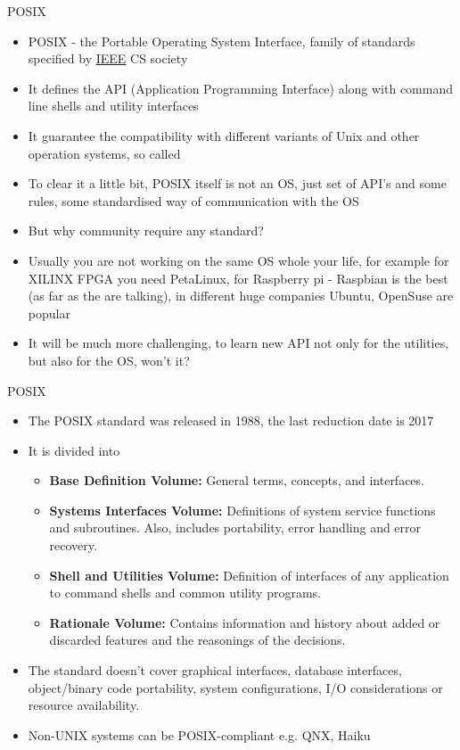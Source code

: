 \documentclass[usenames,dvipsnames,10pt,aspectratio=169]{beamer}
\begin{document}
\begin{frame}{POSIX}
    \begin{itemize}
        \item POSIX - the Portable Operating System Interface, family of standards specified by \href{https://www.ieee.org/}{IEEE} CS society
        \item It defines the API (Application Programming Interface) along with command line shells and utility interfaces
        \item It guarantee the compatibility with different variants of Unix and other operation systems, so called 
        \item To clear it a little bit, POSIX itself is not an OS, just set of API's and some rules, some standardised way of communication with the OS
        \item But why community require any standard? 
        \item Usually you are not working on the same OS whole your life, for example for XILINX FPGA you need PetaLinux, for Raspberry pi - Raspbian is the best (as far as the are talking), in different huge companies Ubuntu, OpenSuse are popular
        \item It will be much more challenging, to learn new API not only for the utilities, but also for the OS, won't it?
    \end{itemize}
\end{frame}

\begin{frame}{POSIX}
    \begin{itemize}
        \item The POSIX standard was released in 1988, the last reduction date is 2017
        \item It is divided into
        \begin{itemize}
            \item \textbf{Base Definition Volume:} General terms, concepts, and interfaces.
            \item \textbf{Systems Interfaces Volume:} Definitions of system service functions and subroutines. Also, includes portability, error handling and error recovery.
            \item \textbf{Shell and Utilities Volume:} Definition of interfaces of any application to command shells and common utility programs.
            \item \textbf{Rationale Volume:} Contains information and history about added or discarded features and the reasonings of the decisions.
        \end{itemize}
        \item The standard doesn’t cover graphical interfaces, database interfaces, object/binary code portability, system configurations, I/O considerations or resource availability.
        \item {} Non-UNIX systems can be POSIX-compliant e.g. QNX, Haiku
    \end{itemize}
\end{frame}
\end{document}
